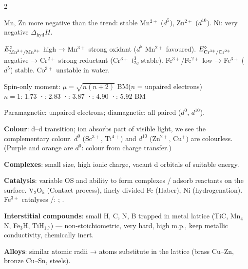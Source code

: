 \documentclass[9pt,a4paper]{extarticle}
\begin{document}
\begin{multicols}{2}
\begin{fl}
\item Mn, Zn more negative than the trend: stable Mn$^{2+}$ ($d^5$), Zn$^{2+}$ ($d^{10}$). Ni: very negative $\Delta_\text{hyd}H$.
\item $E^\circ_{\ce{Mn^3+/Mn^2+}}$ high → Mn$^{3+}$ strong oxidant ($d^5$ Mn$^{2+}$ favoured). $E^\circ_{\ce{Cr^3+/Cr^2+}}$ negative → Cr$^{2+}$ strong reductant (Cr$^{3+}$ $t_{2g}^3$ stable). Fe$^{3+}$/Fe$^{2+}$ low → Fe$^{3+}$ ($d^5$) stable. Co$^{3+}$ unstable in water.
\end{fl}
\begin{kbox}
Spin-only moment: $\mu=\sqrt{n(n+2)}$ BM\quad($n$ = unpaired electrons)\\
$n=1$: 1.73 \;·: 2.83 \;·: 3.87 \;·: 4.90 \;·: 5.92 BM
\end{kbox}
\begin{fl}
\item Paramagnetic: unpaired electrons; diamagnetic: all paired ($d^0$, $d^{10}$).
\item \textbf{Colour}: d--d transition; ion absorbs part of visible light, we see the complementary colour. $d^0$ (Sc$^{3+}$, Ti$^{4+}$) and $d^{10}$ (Zn$^{2+}$, Cu$^+$) are colourless. (Purple  and orange  are $d^0$: colour from charge transfer.)
\item \textbf{Complexes}: small size, high ionic charge, vacant d orbitals of suitable energy.
\item \textbf{Catalysis}: variable OS and ability to form complexes / adsorb reactants on the surface. V$_2$O$_5$ (Contact process), finely divided Fe (Haber), Ni (hydrogenation). Fe$^{3+}$ catalyses /: ; .
\item \textbf{Interstitial compounds}: small H, C, N, B trapped in metal lattice (TiC, Mn$_4$N, Fe$_3$H, TiH$_{1.7}$) — non-stoichiometric, very hard, high m.p., keep metallic conductivity, chemically inert.
\item \textbf{Alloys}: similar atomic radii → atoms substitute in the lattice (brass Cu--Zn, bronze Cu--Sn, steels).
\end{fl}


\end{multicols}
\end{document}
